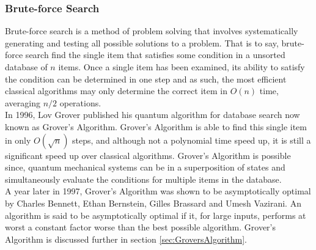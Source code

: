 \documentclass{amsart}
\numberwithin{equation}{section}
\begin{document}
\subsubsection{Brute-force Search}
\begin{justify}
Brute-force search is a method of problem solving that involves systematically generating and testing all possible solutions to a problem. That is to say, brute-force search find the single item that satisfies some condition in a unsorted database of $n$ items. Once a single item has been examined, its ability to satisfy the condition can be determined in one step and as such, the most efficient classical algorithms may only determine the correct item in $O(n)$ time, averaging $n/2$ operations. \\

In 1996, Lov Grover published his quantum algorithm for database search \cite{Grover1996} now known as Grover's Algorithm. Grover's Algorithm is able to find this single item in only $O(\sqrt{n})$ steps, and although not a polynomial time speed up, it is still a significant speed up over classical algorithms. Grover's Algorithm is possible since, quantum mechanical systems can be in a superposition of states and simultaneously evaluate the conditions for multiple items in the database. \\

A year later in 1997, Grover's Algorithm was shown to be asymptotically optimal by Charles Bennett, Ethan Bernstein, Gilles Brassard and Umesh Vazirani. \cite{BennettBernsteinBrassardVazirani1997} An algorithm is said to be asymptotically optimal if it, for large inputs, performs at worst a constant factor worse than the best possible algorithm.  Grover's Algorithm is discussed further in section \ref{sec:GroversAlgorithm}.
\end{justify}
\end{document}
